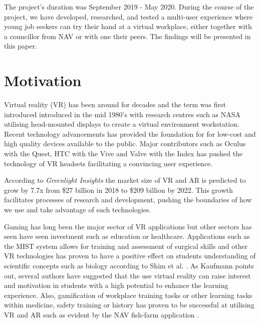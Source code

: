 The project's duration was September 2019 - May 2020. During the course of the project, we have developed, researched, and tested a multi-user experience where young job seekers can try their hand at a virtual workplace, either together with a councillor from NAV or with one their peers. The findings will be presented in this paper.

\section{Motivation}
Virtual reality (VR) has been around for decades and the term was first introduced introduced in the mid 1980's \cite{historyVR} with research centres such as NASA utilising head-mounted displays to create a virtual environment workstation. Recent technology advancements has provided the foundation for for low-cost and high quality devices available to the public. Major contributors such as Oculus with the Quest, HTC with the Vive and Valve with the Index has pushed the technology of VR headsets facilitating a convincing user experience.  

According to \textit{Greenlight Insights} \cite{forcastVR} the market size of VR and AR is predicted to grow by 7.7x from \$27 billion in 2018 to \$209 billion by 2022. This growth facilitates processes of research and development, pushing the boundaries of how we use and take advantage of such technologies.

Gaming has long been the major sector of VR applications but other sectors has seen have seen investment such as education or healthcare. Applications such as the MIST system \cite{mccloy2001virtual} allows for training and assessment of surgical skills and other VR technologies has proven to have a positive effect on students understanding of scientific concepts such as biology according to Shim et al. \cite{shim2003application}. As Kaufmann \cite{kaufmann2003collaborative} points out, several authors have suggested that the use virtual reality can raise interest and motivation in students with a high potential to enhance the learning experience.
Also, gamification of workplace training tasks or other learning tasks within medicine, safety training or history has proven to be successful at utilising VR and AR such as evident by the NAV fish-farm application \cite{fishfarmNAV}.








